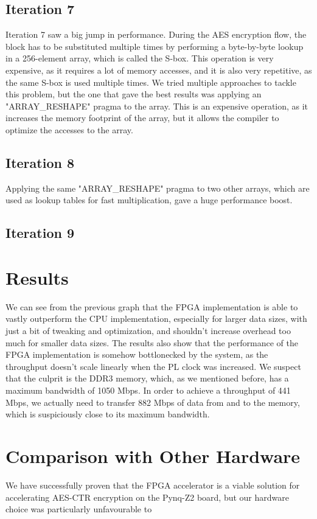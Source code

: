 \documentclass[12pt,oneside,a4paper]{article}
\begin{document}
\subsection{Iteration 7} \label{subsec:iter7}
Iteration 7 saw a big jump in performance. During the AES encryption flow, the block has to be substituted multiple times by performing a byte-by-byte lookup in a 256-element array, which is called the S-box.
This operation is very expensive, as it requires a lot of memory accesses, and it is also very repetitive, as the same S-box is used multiple times.
We tried multiple approaches to tackle this problem, but the one that gave the best results was applying an "ARRAY\_RESHAPE" pragma to the array.
This is an expensive operation, as it increases the memory footprint of the array, but it allows the compiler to optimize the accesses to the array. 

\subsection{Iteration 8} \label{subsec:iter8}
Applying the same "ARRAY\_RESHAPE" pragma to two other arrays, which are used as lookup tables for fast multiplication, gave a huge performance boost.

\subsection{Iteration 9} \label{subsec:iter9}


\section{Results} \label{sec:results}
We can see from the previous graph that the FPGA implementation is able to vastly outperform the CPU implementation, especially for larger data sizes, with just a bit of tweaking and optimization, and shouldn't increase overhead too much for smaller data sizes.
The results also show that the performance of the FPGA implementation is somehow bottlonecked by the system, as the throughput doesn't scale linearly when the PL clock was increased.
We suspect that the culprit is the DDR3 memory, which, as we mentioned before, has a maximum bandwidth of 1050 Mbps. In order to achieve a throughput of 441 Mbps, we actually need to transfer 882 Mbps of data from and to the memory, which is suspiciously close to its maximum bandwidth.

\section{Comparison with Other Hardware} \label{sec:conclusions}
We have successfully proven that the FPGA accelerator is a viable solution for accelerating AES-CTR encryption on the Pynq-Z2 board, but our hardware choice was particularly unfavourable to 

\printbibliography
\end{document}
